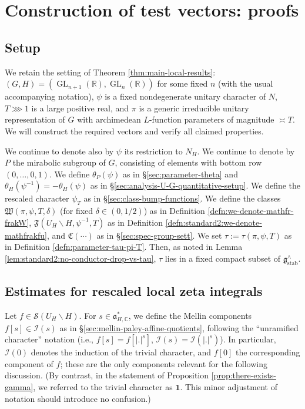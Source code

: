 \documentclass[reqno]{amsart}
\DeclareMathOperator{\GL}{GL}
\DeclareMathOperator{\stab}{stab}
\theoremstyle{plain} \newtheorem{theorem} {Theorem}
\theoremstyle{definition} \newtheorem{definition} [theorem] {Definition}
\theoremstyle{itplain} %
\numberwithin{equation}{section}
\numberwithin{theorem}{section}
\begin{document}
\section{Construction of test vectors: proofs}\label{sec:constr-test-vect-proofs}

\subsection{Setup}\label{sec:constr-test-vec-setup}
We retain the setting of Theorem \ref{thm:main-local-results}: $(G,H) = (\GL_{n+1}(\mathbb{R}),\GL_n(\mathbb{R}))$ for some fixed $n$ (with the usual accompanying notation), $\psi$ is a fixed nondegenerate unitary character of $N$, $T \ggg 1$ is a large positive real, and $\pi$ is a generic irreducible unitary representation of $G$ with archimedean $L$-function parameters of magnitude $\asymp T$.  We will construct the required vectors and verify all claimed properties.

We continue to denote also by $\psi$ its restriction to $N_H$.  We continue to denote by $P$ the mirabolic subgroup of $G$, consisting of elements with bottom row $(0,\dotsc,0,1)$.  We define $\theta_P(\psi)$ as in \S\ref{sec:parameter-theta} and $\theta_H(\psi^{-1}) = - \theta_H(\psi)$ as in \S\ref{sec:analysis-U-G-quantitative-setup}.  We define the rescaled character $\psi_T$ as in \S\ref{sec:class-bump-functions}.  We define the classes $\mathfrak{W}(\pi,\psi,T,\delta)$ (for fixed $\delta \in (0,1/2)$) as in Definition \ref{defn:we-denote-mathfr-frakW}, $\mathfrak{F}(U_H \backslash H, \psi^{-1}, T)$ as in Definition \ref{defn:standard2:we-denote-mathfrakfu}, and $\mathfrak{C}(\dotsb)$ as in \S\ref{sec:spec-group-sett}.  We set $\tau := \tau(\pi,\psi,T)$ as in Definition \ref{defn:parameter-tau-pi-T}.  Then, as noted in Lemma \ref{lem:standard2:no-conductor-drop-vs-tau}, $\tau$ lies in a fixed compact subset of $\mathfrak{g}^\wedge_{\stab}$.


\subsection{Estimates for rescaled local zeta integrals}\label{sec:estim-resc-local}
Let $f \in \mathcal{S}(U_H \backslash H)$.  For $s \in \mathfrak{a}_{H,\mathbb{C}}^*$, we define the Mellin components $f[s] \in \mathcal{I}(s)$ as in \S\ref{sec:mellin-paley-affine-quotients}, following the ``unramified character'' notation (i.e., $f[s] = f[|.|^s]$, $\mathcal{I}(s) = \mathcal{I}(|.|^s)$).  In particular, $\mathcal{I}(0)$ denotes the induction of the trivial character, and $f[0]$ the corresponding component of $f$; these are the only components relevant for the following discussion.  (By contrast, in the statement of Proposition \ref{prop:there-exists-gamma}, we referred to the trivial character as $\mathbf{1}$.  This minor adjustment of notation should introduce no confusion.)
\end{document}
